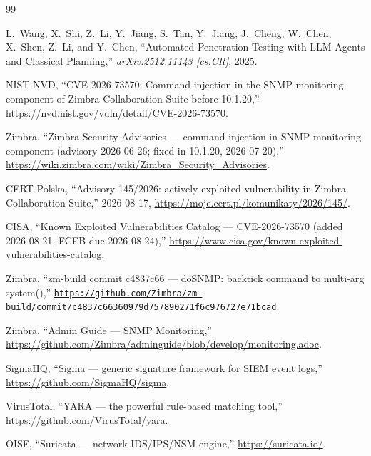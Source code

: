 \begin{thebibliography}{99}

L.~Wang, X.~Shi, Z.~Li, Y.~Jiang, S.~Tan, Y.~Jiang, J.~Cheng, W.~Chen,
X.~Shen, Z.~Li, and Y.~Chen, ``Automated Penetration Testing with LLM Agents
and Classical Planning,'' \emph{arXiv:2512.11143 [cs.CR]}, 2025.

NIST NVD, ``CVE-2026-73570: Command injection in the SNMP monitoring
component of Zimbra Collaboration Suite before 10.1.20,''
\url{https://nvd.nist.gov/vuln/detail/CVE-2026-73570}.

Zimbra, ``Zimbra Security Advisories — command injection in SNMP
monitoring component (advisory 2026-06-26; fixed in 10.1.20, 2026-07-20),''
\url{https://wiki.zimbra.com/wiki/Zimbra_Security_Advisories}.

CERT Polska, ``Advisory 145/2026: actively exploited vulnerability in
Zimbra Collaboration Suite,'' 2026-08-17,
\url{https://moje.cert.pl/komunikaty/2026/145/}.

CISA, ``Known Exploited Vulnerabilities Catalog — CVE-2026-73570
(added 2026-08-21, FCEB due 2026-08-24),''
\url{https://www.cisa.gov/known-exploited-vulnerabilities-catalog}.

Zimbra, ``zm-build commit c4837c66 —
doSNMP: backtick command to multi-arg system(),''
\href{https://github.com/Zimbra/zm-build/commit/c4837c66360979d757890271f6c976727e71bcad}{\texttt{https://github.com/Zimbra/zm-build/commit/\hspace{0pt}c4837c663609\hspace{0pt}79d757890271\hspace{0pt}f6c976727e71bcad}}.

Zimbra, ``Admin Guide — SNMP Monitoring,''
\url{https://github.com/Zimbra/adminguide/blob/develop/monitoring.adoc}.

SigmaHQ, ``Sigma — generic signature framework for SIEM event logs,''
\url{https://github.com/SigmaHQ/sigma}.

VirusTotal, ``YARA — the powerful rule-based matching tool,''
\url{https://github.com/VirusTotal/yara}.

OISF, ``Suricata — network IDS/IPS/NSM engine,''
\url{https://suricata.io/}.

\end{thebibliography}


